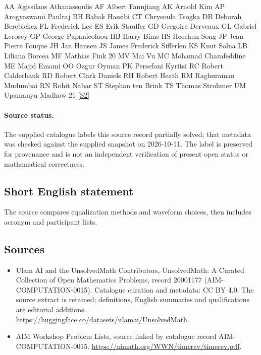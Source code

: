 \documentclass[11pt]{article}
\begin{document}
AA Agissilaos Athanassoulis AF Albert Fannjiang AK Arnold Kim AP Arogyaswami Paulraj BH Babak Hassibi CT Chrysoula Tsogka DB Deborah Berebichez FL Frederick Lee ES Erik Stauffer GD Gregoire Derveaux GL Gabriel Lerosey GP George Papanicolaou HB Harry Bims HS Heechun Song JF Jean-Pierre Fouque JH Jan Hansen JS James Frederick Sifferlen KS Knut Solna LB Liliana Borcea MF Mathias Fink 20 MV Mai Vu MC Mohamad Charafeddine ME Majid Emami OO Ozgur Oyman PK Persefoni Kyritsi RC Robert Calderbank RD Robert Clark Daniels RH Robert Heath RM Raghuraman Mudumbai RN Rohit Nabar ST Stephan ten Brink TS Thomas Strohmer UM Upamanyu Madhow 21 \href{https://aimath.org/WWN/timerev/timerev.pdf}{[S2]}
\paragraph{Source status.}
The supplied catalogue labels this source record partially solved; that metadata was checked against the supplied snapshot on 2026-10-11. The label is preserved for provenance and is not an independent verification of present open status or mathematical correctness.
\subsection{Short English statement}
The source compares equalization methods and waveform choices, then includes acronym and participant lists.
\subsection{Sources}
\begin{itemize}
\item[S1] Ulam AI and the UnsolvedMath Contributors, UnsolvedMath: A Curated Collection of Open Mathematics Problems, record 20001177 (AIM-COMPUTATION-0015). Catalogue curation and metadata: CC BY 4.0. The source extract is retained; definitions, English summaries and qualifications are editorial additions.
\url{https://huggingface.co/datasets/ulamai/UnsolvedMath}.
\item[S2] AIM Workshop Problem Lists, source linked by catalogue record AIM-COMPUTATION-0015.
\url{https://aimath.org/WWN/timerev/timerev.pdf}.
\end{itemize}
\end{document}
